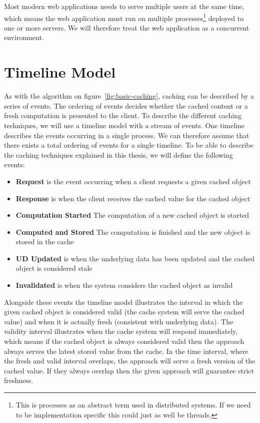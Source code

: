 Most modern web applications needs to serve multiple users at the same time, which means the web application must run on multiple processes\footnote{This is processes as an abstract term used in distributed systems. If we need to be implementation specific this could just as well be threads.} deployed to one or more servers. We will therefore treat the web application as a concurrent environment.


\section{Timeline Model}
\label{sec:timeline-model}

As with the algorithm on figure~\ref{fig:basic-caching}, caching can be described by a series of events. The ordering of events decides whether the cached content or a fresh computation is presented to the client. To describe the different caching techniques, we will use a timeline model with a stream of events. One timeline describes the events occurring in a single process. We can therefore assume that there exists a total ordering of events for a single timeline. To be able to describe the caching techniques explained in this thesis, we will define the following events:

\begin{itemize}
  \item \textbf{Request} is the event occurring when a client requests a given cached object
  \item \textbf{Response} is when the client receives the cached value for the cached object
  \item \textbf{Computation Started} The computation of a new cached object is started
  \item \textbf{Computed and Stored} The computation is finished and the new object is stored in the cache
  \item \textbf{UD Updated} is when the underlying data has been updated and the cached object is considered stale
  \item \textbf{Invalidated} is when the system considers the cached object as invalid
\end{itemize}

Alongside these events the timeline model illustrates the interval in which the given cached object is considered valid (the cache system will serve the cached value) and when it is actually fresh (consistent with underlying data). The validity interval illustrates when the cache system will respond immediately, which means if the cached object is always considered valid then the approach always serves the latest stored value from the cache. In the time interval, where the fresh and valid interval overlaps, the approach will serve a fresh version of the cached value. If they always overlap then the given approach will guarantee strict freshness.

